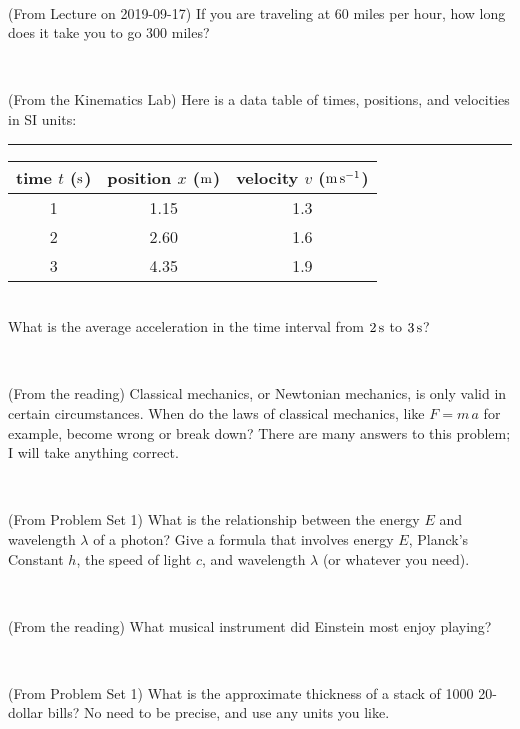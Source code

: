 \documentclass[12pt, letterpaper]{article}
\begin{document}
\vfill ~

\begin{problem} (From Lecture on 2019-09-17)
If you are traveling at 60 miles per hour, how long does
it take you to go 300 miles?
\end{problem}


\vfill ~

\begin{problem} (From the Kinematics Lab)
Here is a data table of times, positions, and velocities in SI units:\\
\rule{1.0in}{0pt}\begin{tabular}{c|c|c}
time $t$ ($\mathrm{s}$) & position $x$ ($\mathrm{m}$) & velocity $v$ ($\mathrm{m}\,\mathrm{s}^{-1}$) \\
\hline
1 & 1.15 & 1.3 \\
2 & 2.60 & 1.6 \\
3 & 4.35 & 1.9 \\
\hline
\end{tabular}\\
What is the average acceleration in the time interval from $2\,\mathrm{s}$ to $3\,\mathrm{s}$?
\end{problem}


\vfill ~


\clearpage


\begin{problem} (From the reading)
Classical mechanics, or Newtonian mechanics, is only valid in certain
circumstances. When do the laws of classical mechanics, like $F =
m\,a$ for example, become wrong or break down? There are many answers
to this problem; I will take anything correct.
\end{problem}


\vfill ~

\begin{problem} (From Problem Set 1)
What is the relationship between the energy $E$ and wavelength
$\lambda$ of a photon? Give a formula that involves energy $E$,
Planck's Constant $h$, the speed of light $c$, and wavelength
$\lambda$ (or whatever you need).
\end{problem}

\vfill ~

\begin{problem} (From the reading)
What musical instrument did Einstein most enjoy playing?
\end{problem}


\vfill ~

\begin{problem} (From Problem Set 1)
What is the approximate thickness of a stack of 1000 20-dollar bills?
No need to be precise, and use any units you like.
\end{problem}
\end{document}

